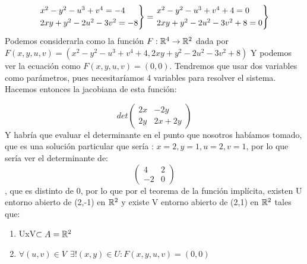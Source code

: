 \begin{ejer}[6 de la relación]

\[
\begin{rcases}
	x^2 - y^2 -u^3 +v^4 = -4\\
	2xy + y^2 -2u^2 -3v^2 = -8
\end{rcases} = \begin{rcases}
	x^2 - y^2 -u^3 +v^4  + 4= 0\\
	2xy + y^2 -2u^2 -3v^2  + 8=  0
\end{rcases}
\]
	Podemos considerarla como la función $F: \mathbb{R}^4 \to \mathbb{R}^2$ dada por\\
	 $F(x,y,u,v) = (x^2 - y^2 -u^3 +v^4  + 4,2xy + y^2 -2u^2 -3v^2  + 8)$
	 Y podemos ver la ecuación como $F(x,y,u,v) = (0,0)$.
	 Tendremos que usar dos variables como parámetros, pues necesitaríamos 4 variables para resolver el sistema.
	 Hacemos entonces la jacobiana de esta función:

	 \[
	 det\begin{pmatrix}
 2x & -2y \\
 2y & 2x+2y
\end{pmatrix}
	 \]
	 Y habría que evaluar el determinante en el punto que nosotros habíamos tomado, que es una solución particular que sería : $x=2, y = 1,u = 2,v = 1$, por lo que sería ver el determinante de:
	 \[
	 \begin{pmatrix}
 4 & 2 \\
 -2 & 0
\end{pmatrix}
	 \]
, que es distinto de 0, por lo que por el teorema de la función implícita, existen U entorno abierto de (2,-1) en $\mathbb{R}^2$ y existe V entorno abierto de (2,1) en $\mathbb{R}^2$ tales que:
\begin{enumerate}
	\item UxV$\subset A = \mathbb{R}^2$
	\item $\forall(u,v) \in V \ \ \exists ! (x,y) \in U : F(x,y,u,v) = (0,0)$
\end{enumerate}
\end{ejer}



